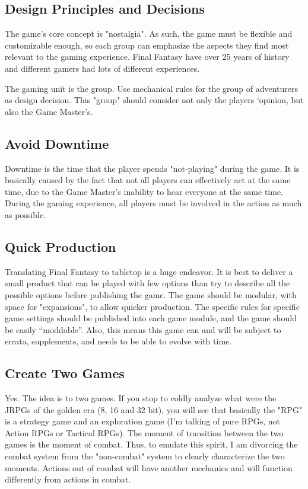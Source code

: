 \begin{multicols}{2}
\section{Design Principles and Decisions}
The game's core concept is "nostalgia". As
such, the game must be flexible and customizable
enough, so each group can emphasize the aspects
they find most relevant to the gaming experience.
Final Fantasy have over 25 years of history and
different gamers had lots of different experiences.

The gaming unit is the group. Use
mechanical rules for the group of adventurers as
design decision. This "group" should consider not
only the players ‘opinion, but also the Game
Master's.
\subsection{Avoid Downtime}
Downtime is the time that the player spends
"not-playing" during the game. It is basically
caused by the fact that not all players can
effectively act at the same time, due to the Game
Master’s inability to hear everyone at the same
time. During the gaming experience, all players
must be involved in the action as much as possible.
\subsection{Quick Production}
Translating Final Fantasy to tabletop is a
huge endeavor. It is best to deliver a small product
that can be played with few options than try to
describe all the possible options before publishing
the game. The game should be modular, with space
for "expansions", to allow quicker production. The
specific rules for specific game settings should be
published into each game module, and the game
should be easily “moddable”. Also, this means this
game can and will be subject to errata,
supplements, and needs to be able to evolve with
time.
\subsection{Create Two Games}
Yes. The idea is to two games. If you stop to
coldly analyze what were the JRPGs of the golden
era (8, 16 and 32 bit), you will see that basically
the "RPG" is a strategy game and an exploration
game (I'm talking of pure RPGs, not Action RPGs or
Tactical RPGs). The moment of transition between
the two games is the moment of combat. Thus, to
emulate this spirit, I am divorcing the combat
system from the "non-combat" system to clearly
characterize the two moments. Actions out of
combat will have another mechanics and will
function differently from actions in combat.

\end{multicols}
